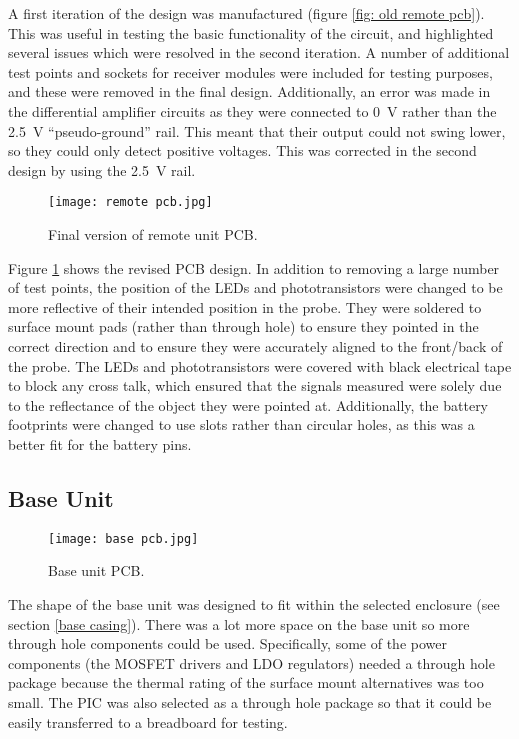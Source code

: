 A first iteration of the design was manufactured (figure \ref{fig: old remote pcb}). This was useful in testing the basic functionality of the circuit, and highlighted several issues which were resolved in the second iteration. A number of additional test points and sockets for receiver modules were included for testing purposes, and these were removed in the final design. Additionally, an error was made in the differential amplifier circuits as they were connected to \SI{0}{\volt} rather than the \SI{2.5}{\volt} ``pseudo-ground'' rail. This meant that their output could not swing lower, so they could only detect positive voltages. This was corrected in the second design by using the \SI{2.5}{\volt} rail.



\begin{figure}[htbp]
	\centering
	\texttt{[image: remote pcb.jpg]}
	\caption{Final version of remote unit PCB.}
	\label{fig: remote pcb}
\end{figure}

Figure \ref{fig: remote pcb} shows the revised PCB design. In addition to removing a large number of test points, the position of the LEDs and phototransistors were changed to be more reflective of their intended position in the probe. They were soldered to surface mount pads (rather than through hole) to ensure they pointed in the correct direction and to ensure they were accurately aligned to the front/back of the probe. The LEDs and phototransistors were covered with black electrical tape to block any cross talk, which ensured that the signals measured were solely due to the reflectance of the object they were pointed at. Additionally, the battery footprints were changed to use slots rather than circular holes, as this was a better fit for the battery pins.\\






\subsection{Base Unit}

\begin{figure}[htbp]
	\centering
	\texttt{[image: base pcb.jpg]}
	\caption{Base unit PCB.}
	\label{fig: base pcb}
\end{figure}

The shape of the base unit was designed to fit within the selected enclosure (see section \ref{base casing}). There was a lot more space on the base unit so more through hole components could be used. Specifically, some of the power components (the MOSFET drivers and LDO regulators) needed a through hole package because the thermal rating of the surface mount alternatives was too small. The PIC was also selected as a through hole package so that it could be easily transferred to a breadboard for testing.